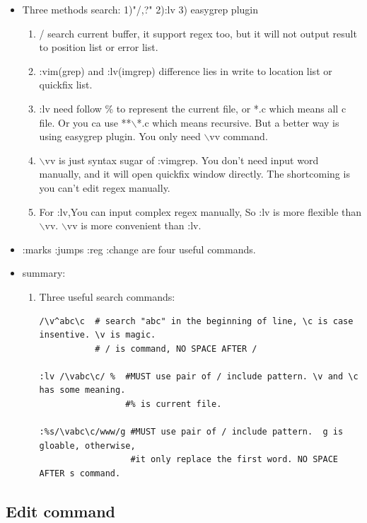 \documentclass[a4paper,11pt,twoside]{book}
\begin{document}
\begin{itemize}
\item Three methods search: 1)"/,?" 2):lv 3) easygrep plugin
		\begin{enumerate}
						\item / search current buffer, it support regex too, but it will not output result to position list or error list. 

						\item :vim(grep) and :lv(imgrep) difference lies in write to location list or quickfix list.

						\item :lv need follow \% to represent the current file, or *.c which means all c file. Or you ca use **$\backslash$*.c which means recursive. But a better way is using easygrep plugin. You only need $\backslash$vv command.
										
						\item $\backslash$vv is just syntax sugar of :vimgrep. You don't need input word manually, and it will open quickfix window directly. The shortcoming is you can't edit regex manually. 

								
						\item For :lv,You can input complex regex manually, So :lv is more flexible than $\backslash$vv. $\backslash$vv is more convenient than :lv. 
						\end{enumerate}

		\item :marks :jumps :reg :change are four useful commands. 		
		\item summary:
				\begin{enumerate}
						\item Three useful search commands:
\begin{verbatim}
/\v^abc\c  # search "abc" in the beginning of line, \c is case insentive. \v is magic. 
           # / is command, NO SPACE AFTER /

:lv /\vabc\c/ %  #MUST use pair of / include pattern. \v and \c has some meaning. 
                 #% is current file.

:%s/\vabc\c/www/g #MUST use pair of / include pattern.  g is gloable, otherwise,
                  #it only replace the first word. NO SPACE AFTER s command. 
\end{verbatim}

				\end{enumerate}
\end{itemize}

\subsection{Edit command}
\end{document}
